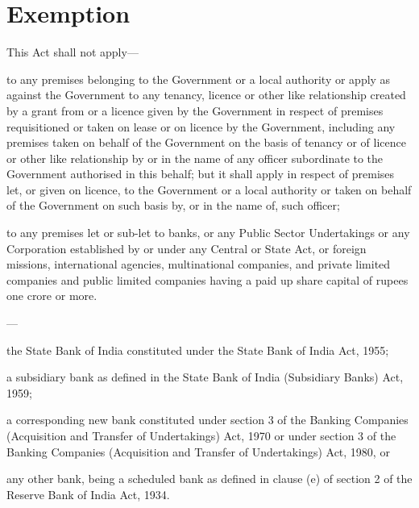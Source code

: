 \documentclass{mhact}
\begin{document}
\section{Exemption}
\begin{subsectionlist}
\item This Act shall not apply---
  \begin{clause}
  \item to any premises belonging to the Government or a local
    authority or apply as against the Government to any tenancy,
    licence or other like relationship created by a grant from or a
    licence given by the Government in respect of premises
    requisitioned or taken on lease or on licence by the Government,
    including any premises taken on behalf of the Government on the
    basis of tenancy or of licence or other like relationship by or in
    the name of any officer subordinate to the Government authorised
    in this behalf; but it shall apply in respect of premises let, or
    given on licence, to the Government or a local authority or taken
    on behalf of the Government on such basis by, or in the name of,
    such officer;
  \item to any premises let or sub-let to banks, or any Public Sector
    Undertakings or any Corporation established by or under any
    Central or State Act, or foreign missions, international agencies,
    multinational companies, and private limited companies and public
    limited companies having a paid up share capital of rupees one
    crore or more.

    ---
    
    \begin{subclause}
    \item  the State Bank of India constituted under the State Bank of India Act,
      1955;  
    \item  a subsidiary bank as defined in the State Bank of India (Subsidiary
      Banks) Act, 1959; 

    \item a corresponding new bank constituted under section 3 of the
      Banking Companies (Acquisition and Transfer of Undertakings)
      Act, 1970  or under section 3 of the Banking
      Companies (Acquisition and Transfer of Undertakings) Act, 1980,
       or
    \item any other bank, being a scheduled bank as defined in clause
      (e) of section 2 of the Reserve Bank of India Act,
      1934. 
    \end{subclause}
  \end{clause}


\end{subsectionlist}
\end{document}
